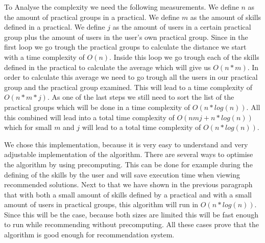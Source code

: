 To Analyse the complexity we need the following measurements.
We define $n$ as the amount of practical groups in a practical.
We define $m$ as the amount of skills defined in a practical.
We define $j$ as the amount of users in a certain practical group plus the amount of users in the user's own practical group.
Since in the first loop we go trough the practical groups to calculate the distance we start with a time complexity of $O(n)$.
Inside this loop we go trough each of the skills defined in the practical to calculate the average which will give us $O(n*m)$.
In order to calculate this average we need to go trough all the users in our practical group and the practical group examined.
This will lead to a time complexity of $O(n*m*j)$.
As one of the last steps we still need to sort the list of the practical groups which will be done in a time complexity of $O(n*log(n))$.
All this combined will lead into a total time complexity of $O(nmj+n*log(n))$ which for small $m$ and $j$ will lead to a total time complexity of $O(n*log(n))$.

We chose this implementation, because it is very easy to understand and very adjustable implementation of the algorithm.
There are several ways to optimise the algorithm by using precomputing.
This can be done for example during the defining of the skills by the user and will save execution time when viewing recommended solutions.
Next to that we have shown in the previous paragraph that with both a small amount of skills defined by a practical and with a small amount of users in practical groups, this algorithm will run in $O(n*log(n))$.
Since this will be the case, because both sizes are limited this will be fast enough to run while recommending without precomputing.
All these cases prove that the algorithm is good enough for recommendation system.



